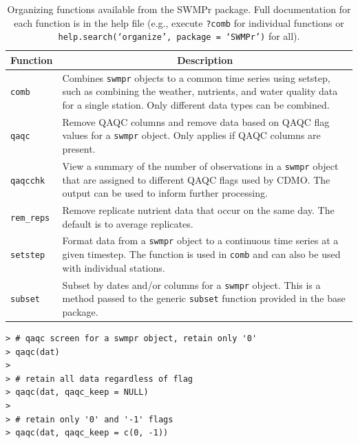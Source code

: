 \documentclass[10pt,letterpaper]{article}\usepackage[]{graphicx}\usepackage[]{color}
\makeatletter
\newenvironment{kframe}{%
 \def\at@end@of@kframe{}%
 \ifinner\ifhmode%
  \def\at@end@of@kframe{\end{minipage}}%
  \begin{minipage}{\columnwidth}%
 \fi\fi%
 \def\FrameCommand##1{\hskip\@totalleftmargin \hskip-\fboxsep
 \colorbox{shadecolor}{##1}\hskip-\fboxsep
     \hskip-\linewidth \hskip-\@totalleftmargin \hskip\columnwidth}%
 \MakeFramed {\advance\hsize-\width
   \@totalleftmargin\z@ \linewidth\hsize
   \@setminipage}}%
 {\par\unskip\endMakeFramed%
 \at@end@of@kframe}
\newenvironment{knitrout}{}{} %
\makeatother
\begin{document}
\begin{table}[!tbp]
\caption{Organizing functions available from the SWMPr package. Full documentation for each function is in the help file (e.g., execute \texttt{?comb} for individual functions or \texttt{help.search(`organize', package = `SWMPr')} for all).\label{tab:organize}} 
\begin{center}
\begin{tabular}{lp{3.5in}}
\hline\hline
\multicolumn{1}{l}{Function}&\multicolumn{1}{c}{Description}\tabularnewline
\hline
\texttt{comb}&Combines \texttt{swmpr} objects to a common time series using setstep, such as combining the weather, nutrients, and water quality data for a single station. Only different data types can be combined.\tabularnewline
\texttt{qaqc}&Remove \ac{QAQC} columns and remove data based on \ac{QAQC} flag values for a \texttt{swmpr} object.  Only applies if \ac{QAQC} columns are present. \tabularnewline
\texttt{qaqcchk}&View a summary of the number of observations in a \texttt{swmpr} object that are assigned to different \ac{QAQC} flags used by \ac{CDMO}.  The output can be used to inform further processing.\tabularnewline
\texttt{rem\_reps}&Remove replicate nutrient data that occur on the same day.  The default is to average replicates.\tabularnewline
\texttt{setstep}&Format data from a \texttt{swmpr} object to a continuous time series at a given timestep.  The function is used in \texttt{comb} and can also be used with individual stations.\tabularnewline
\texttt{subset}&Subset by dates and/or columns for a \texttt{swmpr} object.  This is a method passed to the generic \texttt{subset} function provided in the base package.\tabularnewline
\hline
\end{tabular}\end{center}

\end{table}


\begin{knitrout}\small
{}\color{fgcolor}\begin{kframe}
\begin{verbatim}
> # qaqc screen for a swmpr object, retain only '0'
> qaqc(dat)
> 
> # retain all data regardless of flag
> qaqc(dat, qaqc_keep = NULL)
> 
> # retain only '0' and '-1' flags
> qaqc(dat, qaqc_keep = c(0, -1))
\end{verbatim}
\end{kframe}
\end{knitrout}
\end{document}

